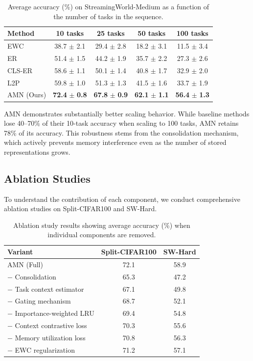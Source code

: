 \documentclass[11pt]{article}
\begin{document}
\begin{table}[h]
\centering
\caption{Average accuracy (\%) on StreamingWorld-Medium as a function of the number of tasks in the sequence.}
\label{tab:scaling}
\begin{tabular}{@{}lcccc@{}}
\toprule
Method & 10 tasks & 25 tasks & 50 tasks & 100 tasks \\
\midrule
EWC & 38.7 $\pm$ 2.1 & 29.4 $\pm$ 2.8 & 18.2 $\pm$ 3.1 & 11.5 $\pm$ 3.4 \\
ER & 51.4 $\pm$ 1.5 & 44.2 $\pm$ 1.9 & 35.7 $\pm$ 2.2 & 27.3 $\pm$ 2.6 \\
CLS-ER & 58.6 $\pm$ 1.1 & 50.1 $\pm$ 1.4 & 40.8 $\pm$ 1.7 & 32.9 $\pm$ 2.0 \\
L2P & 59.8 $\pm$ 1.0 & 51.3 $\pm$ 1.3 & 41.5 $\pm$ 1.6 & 33.7 $\pm$ 1.9 \\
\midrule
AMN (Ours) & \textbf{72.4} $\pm$ \textbf{0.8} & \textbf{67.8} $\pm$ \textbf{0.9} & \textbf{62.1} $\pm$ \textbf{1.1} & \textbf{56.4} $\pm$ \textbf{1.3} \\
\bottomrule
\end{tabular}
\end{table}

AMN demonstrates substantially better scaling behavior. While baseline methods lose 40--70\% of their 10-task accuracy when scaling to 100 tasks, AMN retains 78\% of its accuracy. This robustness stems from the consolidation mechanism, which actively prevents memory interference even as the number of stored representations grows.

\subsection{Ablation Studies}

To understand the contribution of each component, we conduct comprehensive ablation studies on Split-CIFAR100 and SW-Hard.

\begin{table}[h]
\centering
\caption{Ablation study results showing average accuracy (\%) when individual components are removed.}
\label{tab:ablation}
\begin{tabular}{@{}lcc@{}}
\toprule
Variant & Split-CIFAR100 & SW-Hard \\
\midrule
AMN (Full) & 72.1 & 58.9 \\
\quad $-$ Consolidation & 65.3 & 47.2 \\
\quad $-$ Task context estimator & 67.1 & 49.8 \\
\quad $-$ Gating mechanism & 68.7 & 52.1 \\
\quad $-$ Importance-weighted LRU & 69.4 & 54.8 \\
\quad $-$ Context contrastive loss & 70.3 & 55.6 \\
\quad $-$ Memory utilization loss & 70.8 & 56.3 \\
\quad $-$ EWC regularization & 71.2 & 57.1 \\
\bottomrule
\end{tabular}
\end{table}
\end{document}
